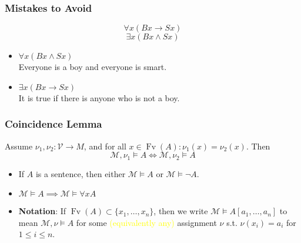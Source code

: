 \documentclass[UTF8,aspectratio=43,11pt,colorlinks,compress,openany]{beamer}%
\begin{document}
\begin{frame}\frametitle{Mistakes to Avoid}
\[\forall x(Bx\to Sx)\]
\[\exists x(Bx\wedge Sx)\]
\begin{itemize}
	\item $\forall x(Bx\wedge Sx)$\\
	Everyone is a boy and everyone is smart.
	\item $\exists x(Bx\to Sx)$\\
	It is true if there is anyone who is not a boy.
\end{itemize}
\end{frame}

\begin{frame}\frametitle{Coincidence Lemma}
	\begin{lemma}
		Assume $\nu_1,\nu_2: \mathcal{V}\to M$, and for all $x\in \operatorname{Fv}(A): \nu_1(x)=\nu_2(x)$. Then
		\[\mathcal{M},\nu_1\vDash A\iff\mathcal{M},\nu_2\vDash A\]
	\end{lemma}
	\begin{itemize}
		\item If $A$ is a sentence, then either $\mathcal{M}\vDash A$ or $\mathcal{M}\vDash\neg A$.
		\item $\mathcal{M}\vDash A\implies\mathcal{M}\vDash\forall x A$
		\item \textbf{Notation}: If $\operatorname{Fv}(A)\subset\{x_1,\dots,x_n\}$, then we write $\mathcal{M}\vDash A[a_1,\dots,a_n]$ to mean $\mathcal{M},\nu\vDash A$ for some \textcolor{yellow}{(equivalently any)} assignment $\nu$ s.t. $\nu(x_i)=a_i$ for $1\leq i\leq n$.
	\end{itemize}
\end{frame}
\end{document}
